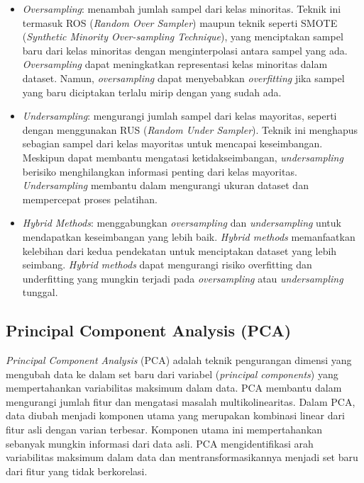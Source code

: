 \documentclass[conference]{IEEEtran}
\begin{document}
\begin{itemize}
    \item \textit{Oversampling}: menambah jumlah sampel dari kelas minoritas. Teknik ini termasuk ROS (\textit{Random Over Sampler}) maupun teknik seperti SMOTE (\textit{Synthetic Minority Over-sampling Technique}), 
    yang menciptakan sampel baru dari kelas minoritas dengan menginterpolasi antara sampel yang ada. 
    \textit{Oversampling} dapat meningkatkan representasi kelas minoritas dalam dataset. Namun, \textit{oversampling} dapat menyebabkan 
    \textit{overfitting} jika sampel yang baru diciptakan terlalu mirip dengan yang sudah ada.
    \item \textit{Undersampling}: mengurangi jumlah sampel dari kelas mayoritas, seperti dengan menggunakan RUS (\textit{Random Under Sampler}). 
    Teknik ini menghapus sebagian sampel dari kelas mayoritas untuk mencapai keseimbangan. Meskipun dapat membantu mengatasi ketidakseimbangan, 
    \textit{undersampling} berisiko menghilangkan informasi penting dari kelas mayoritas. \textit{Undersampling} membantu dalam mengurangi ukuran dataset dan mempercepat 
    proses pelatihan.
    \item \textit{Hybrid Methods}: menggabungkan \textit{oversampling} dan \textit{undersampling} untuk mendapatkan keseimbangan yang lebih baik. 
    \textit{Hybrid methods} memanfaatkan kelebihan dari kedua pendekatan untuk menciptakan dataset yang lebih seimbang. \textit{Hybrid methods} dapat 
    mengurangi risiko overfitting dan underfitting yang mungkin terjadi pada \textit{oversampling} atau \textit{undersampling} tunggal.
\end{itemize}

\subsection{Principal Component Analysis (PCA)}

\textit{Principal Component Analysis} (PCA) adalah teknik pengurangan dimensi yang mengubah data ke dalam set baru dari variabel (\textit{principal components}) yang mempertahankan 
variabilitas maksimum dalam data. PCA membantu dalam mengurangi jumlah fitur dan mengatasi masalah multikolinearitas. Dalam PCA, data diubah menjadi 
komponen utama yang merupakan kombinasi linear dari fitur asli dengan varian terbesar. Komponen utama ini mempertahankan 
sebanyak mungkin informasi dari data asli. PCA mengidentifikasi arah variabilitas maksimum dalam data dan mentransformasikannya menjadi 
set baru dari fitur yang tidak berkorelasi.
\end{document}
